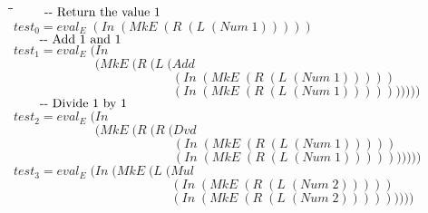 \documentclass[10pt]{article}
\newlength{\lwidth}\setlength{\lwidth}{4.5cm}
\newlength{\cwidth}\setlength{\cwidth}{8mm} %
\newcommand{\Conid}[1]{\mathit{#1}}
\newcommand{\Varid}[1]{\mathit{#1}}
\begin{document}
\begin{tabbing}
\qquad\=\hspace{\lwidth}\=\hspace{\cwidth}\=\+\kill
${\mbox{\qquad-{}-  Return the value 1}}$\\
${\Varid{test}_0\mathrel{=}\Varid{eval}_E\;(\Conid{In}\;(\Conid{MkE}\;(\Conid{R}\;(\Conid{L}\;(\Conid{Num}\;\mathrm{1})))))}$\\
${}$\\
${\mbox{\qquad-{}-  Add 1 and 1}}$\\
${\Varid{test}_1\mathrel{=}\Varid{eval}_E\;(\Conid{In}}$\\
${\phantom{\Varid{test}_1\mathrel{=}\Varid{eval}_E\;(\mbox{}}(\Conid{MkE}\;(\Conid{R}\;(\Conid{L}\;(\Conid{Add}}$\\
${\phantom{\Varid{test}_1\mathrel{=}\Varid{eval}_E\;(\mbox{}}\phantom{(\Conid{MkE}\;(\Conid{R}\;(\Conid{L}\;(\mbox{}}(\Conid{In}\;(\Conid{MkE}\;(\Conid{R}\;(\Conid{L}\;(\Conid{Num}\;\mathrm{1})))))}$\\
${\phantom{\Varid{test}_1\mathrel{=}\Varid{eval}_E\;(\mbox{}}\phantom{(\Conid{MkE}\;(\Conid{R}\;(\Conid{L}\;(\mbox{}}(\Conid{In}\;(\Conid{MkE}\;(\Conid{R}\;(\Conid{L}\;(\Conid{Num}\;\mathrm{1}))))))))))}$\\
${}$\\
${\mbox{\qquad-{}-  Divide 1 by 1}}$\\
${\Varid{test}_2\mathrel{=}\Varid{eval}_E\;(\Conid{In}}$\\
${\phantom{\Varid{test}_2\mathrel{=}\Varid{eval}_E\;(\mbox{}}(\Conid{MkE}\;(\Conid{R}\;(\Conid{R}\;(\Conid{Dvd}}$\\
${\phantom{\Varid{test}_2\mathrel{=}\Varid{eval}_E\;(\mbox{}}\phantom{(\Conid{MkE}\;(\Conid{R}\;(\Conid{R}\;(\mbox{}}(\Conid{In}\;(\Conid{MkE}\;(\Conid{R}\;(\Conid{L}\;(\Conid{Num}\;\mathrm{1})))))}$\\
${\phantom{\Varid{test}_2\mathrel{=}\Varid{eval}_E\;(\mbox{}}\phantom{(\Conid{MkE}\;(\Conid{R}\;(\Conid{R}\;(\mbox{}}(\Conid{In}\;(\Conid{MkE}\;(\Conid{R}\;(\Conid{L}\;(\Conid{Num}\;\mathrm{1}))))))))))}$\\
${}$\\
${\Varid{test}_3\mathrel{=}\Varid{eval}_E\;(\Conid{In}\;(\Conid{MkE}\;(\Conid{L}\;(\Conid{Mul}}$\\
${\phantom{\Varid{test}_3\mathrel{=}\Varid{eval}_E\;(\Conid{In}\;(\Conid{MkE}\;(\Conid{L}\;(\mbox{}}(\Conid{In}\;(\Conid{MkE}\;(\Conid{R}\;(\Conid{L}\;(\Conid{Num}\;\mathrm{2})))))}$\\
${\phantom{\Varid{test}_3\mathrel{=}\Varid{eval}_E\;(\Conid{In}\;(\Conid{MkE}\;(\Conid{L}\;(\mbox{}}(\Conid{In}\;(\Conid{MkE}\;(\Conid{R}\;(\Conid{L}\;(\Conid{Num}\;\mathrm{2})))))))))}$\\

\end{tabbing}
\end{document}
